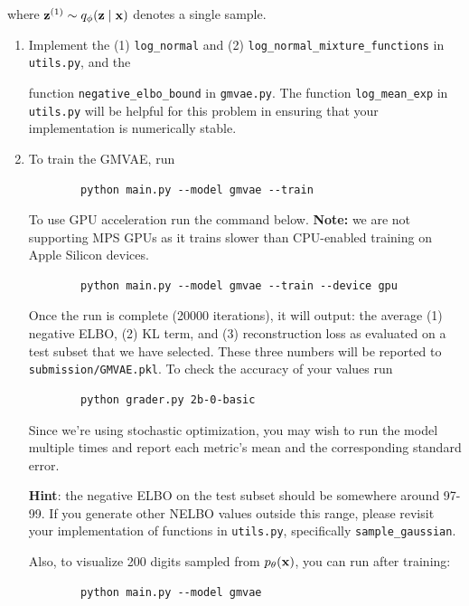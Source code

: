 where $\mathbf{z}^{(1)} \sim q_{\phi}(\mathbf{z} \mid \mathbf{x})$ denotes a single sample.

\begin{enumerate}[label=(\alph*)]
    \item {} Implement the (1) \texttt{log\_normal} and (2) \texttt{log\_normal\_mixture\_functions} in \texttt{utils.py}, and the 

    function \texttt{negative\_elbo\_bound} in \texttt{gmvae.py}. The function \texttt{log\_mean\_exp} in \texttt{utils.py} 
    will be helpful for this problem in ensuring that your implementation is numerically stable.

    \clearpage

    \item {} To train the GMVAE, run 
    \begin{verbatim}
        python main.py --model gmvae --train
    \end{verbatim}
    
    To use GPU acceleration run the command below. \textbf{Note:} we are not supporting MPS GPUs as it trains slower than CPU-enabled training on Apple Silicon devices.
    \begin{verbatim}
        python main.py --model gmvae --train --device gpu
    \end{verbatim}
    
    Once the run is complete (20000 iterations), it will output: the average (1) negative ELBO, (2) KL term, and (3) reconstruction loss as 
    evaluated on a test subset that we have selected. These three numbers will be reported to \texttt{submission/GMVAE.pkl}. To check the accuracy 
    of your values run

    \begin{verbatim}
        python grader.py 2b-0-basic
    \end{verbatim}
    
    Since we’re using stochastic optimization, you may wish to run the model multiple times and report each metric’s mean
    and the corresponding standard error. 
    
    \textbf{Hint}: the negative ELBO on the test subset should be somewhere around 97-99. If you generate other NELBO values outside this range, please
    revisit your implementation of functions in \texttt{utils.py}, specifically \texttt{sample\_gaussian}.

    Also, to visualize 200 digits sampled from $p_{\theta}(\mathbf{x})$, you can run after training: 
    \begin{verbatim}
        python main.py --model gmvae
    \end{verbatim}
    

\end{enumerate}
